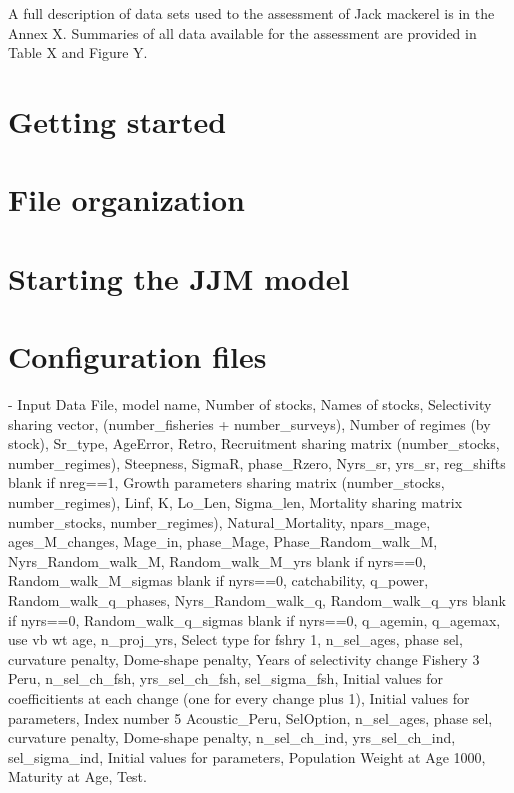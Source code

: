 \documentclass{article}
\begin{document}
A full description of data sets used to the assessment of Jack mackerel is in the Annex X. Summaries of all data available for the assessment are provided in Table X and Figure Y.

\section{Getting started} 

\section{File organization}

\section{Starting the JJM model}

\section{Configuration files}

- Input Data File, model name, Number of stocks, Names of stocks, Selectivity sharing vector, (number\_fisheries + number\_surveys), Number of regimes (by stock), Sr\_type, AgeError, Retro, Recruitment sharing matrix (number\_stocks, number\_regimes), Steepness, SigmaR, phase\_Rzero, Nyrs\_sr, yrs\_sr, reg\_shifts blank if nreg==1, Growth parameters sharing matrix (number\_stocks, number\_regimes), Linf, K, Lo\_Len, Sigma\_len, Mortality sharing matrix number\_stocks, number\_regimes), Natural\_Mortality, npars\_mage, ages\_M\_changes, Mage\_in, phase\_Mage, Phase\_Random\_walk\_M, Nyrs\_Random\_walk\_M, Random\_walk\_M\_yrs blank if nyrs==0, Random\_walk\_M\_sigmas blank if nyrs==0, catchability, q\_power, Random\_walk\_q\_phases, Nyrs\_Random\_walk\_q, Random\_walk\_q\_yrs blank if nyrs==0, Random\_walk\_q\_sigmas blank if nyrs==0, q\_agemin, q\_agemax, use vb wt age, n\_proj\_yrs, Select type for fshry 1, n\_sel\_ages, phase sel, curvature penalty, Dome-shape penalty, Years of selectivity change Fishery 3 Peru, n\_sel\_ch\_fsh, yrs\_sel\_ch\_fsh, sel\_sigma\_fsh, Initial values for coefficitients at each change (one for every change plus 1), Initial values for parameters, Index number 5 Acoustic\_Peru, SelOption, n\_sel\_ages, phase sel, curvature penalty, Dome-shape penalty, n\_sel\_ch\_ind, yrs\_sel\_ch\_ind, sel\_sigma\_ind, Initial values for parameters, Population Weight at Age 1000, Maturity at Age, Test.
\end{document}

